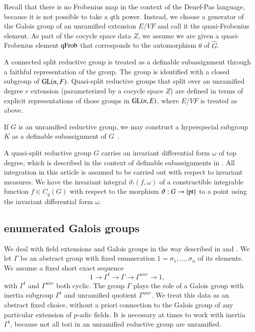 Recall that there is no Frobenius map in the context of the Denef-Pas
language, because it is not possible to take a $q$th power.  Instead,
we choose a generator of the Galois group of an unramified extension
$E/VF$ and call it the quasi-Frobenius element.  As part of the
cocycle space data $Z$, we assume we are given a quasi-Frobenius
element ${\operatorname{qFrob}}$ that corresponds to the automorphism $\theta$ of
$\hat G$.

A connected split reductive group is treated as a definable
subassignment through a faithful representation of the group.  The
group is identified with a closed subgroup of ${\operatorname{GL}}(n,F)$.
Quasi-split reductive groups that split over an unramified degree $r$
extension (parameterized by a cocycle space $Z$) are defined in terms
of explicit representations of those groups in ${\operatorname{GL}}(n,E)$, where
$E/VF$ is treated as above.

If $G$ is an unramified reductive group, we may construct a
hyperspecial subgroup $K$ as a definable subassignment of
$G$~\cite{cluckers2011local}.

A quasi-split reductive group $G$ carries an invariant differential
form $\omega$ of top degree, which is described in the context of
definable subassignments in \cite{gordon}.  All integration in this
article is assumed to be carried out with respect to invariant
measures.  We have the invariant integral $\vartheta_!(f,\omega)$ of a
constructible integrable function $f\in C_q(G)$ with respect to the
morphism $\vartheta:G\to\{{\operatorname{pt}}\}$ to a point using the invariant
differential form $\omega$.

\subsection{enumerated Galois groups}\label{sec:galois}

We deal with field extensions and Galois groups in the way described
in \cite{gordon} and \cite{cluckers2011transfer}.  We let $\Gamma$ be
an abstract group with fixed enumeration $1=\sigma_1,\ldots,\sigma_n$
of its elements.  We assume a fixed short exact sequence
\[
1\to \Gamma^t\to\Gamma\to\Gamma^{unr}\to 1,
\]
with $\Gamma^t$ and $\Gamma^{unr}$ both cyclic.  The group $\Gamma$
plays the role of a Galois group with inertia subgroup $\Gamma^t$ and
unramified quotient $\Gamma^{unr}$.  We treat this data as an abstract
fixed choice, without a priori connection to the Galois group of any
particular extension of $p$-adic fields.  It is necessary at times to
work with inertia $\Gamma^t$, because not all tori in an unramified
reductive group are unramified.

